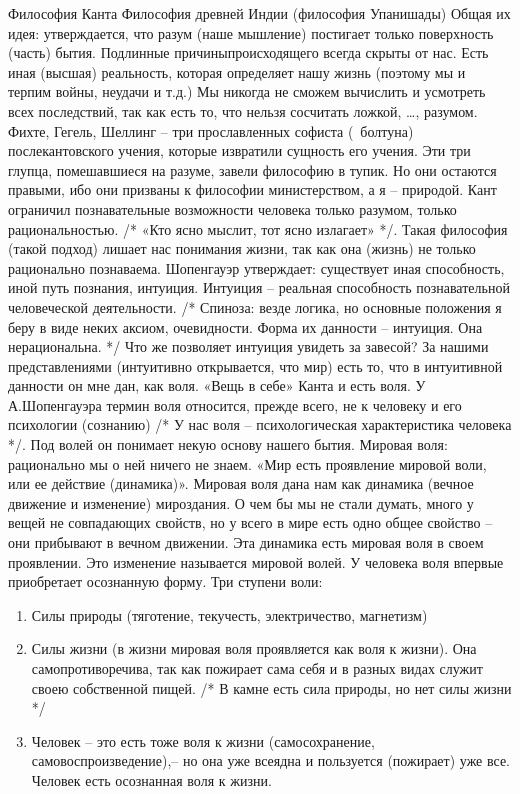 \documentclass[12pt]{article}
\begin{document}
Философия Канта
Философия древней Индии (философия Упанишады)
Общая  их  идея:  утверждается,  что  разум  (наше  мышление)  постигает  только  поверхность  (часть)  бытия.
Подлинные причиныпроисходящего всегда скрыты от нас. Есть иная (высшая) реальность, которая определяет
нашу жизнь (поэтому мы и терпим войны, неудачи и т.д.) Мы никогда не сможем вычислить и усмотреть всех
последствий, так как есть то, что нельзя сосчитать ложкой, …, разумом.
Фихте, Гегель, Шеллинг – три прославленных софиста (~болтуна) послекантовского учения, которые извратили
сущность его учения. Эти три глупца, помешавшиеся на разуме, завели философию в тупик. Но они остаются
правыми, ибо они призваны к философии министерством, а я – природой.
Кант ограничил познавательные возможности человека только разумом, только рациональностью. /* «Кто ясно
мыслит, тот ясно излагает» */. Такая философия (такой подход) лишает нас понимания жизни, так как она
(жизнь) не только рационально познаваема.
Шопенгауэр утверждает: существует иная способность, иной путь познания, интуиция.
Интуиция – реальная способность познавательной человеческой деятельности. /* Спиноза: везде логика, но
основные  положения  я  беру  в  виде  неких  аксиом,  очевидности.  Форма  их  данности  –  интуиция.  Она
нерациональна. */
Что же позволяет интуиция увидеть за завесой? За нашими представлениями (интуитивно открывается, что
мир) есть то, что в интуитивной данности он мне дан, как воля. «Вещь в себе» Канта и есть воля.
У А.Шопенгауэра термин воля относится, прежде всего, не к человеку и его психологии (сознанию) /* У нас
воля – психологическая характеристика человека */. Под волей он понимает некую основу нашего бытия.
Мировая воля: рационально мы о ней ничего не знаем. 
«Мир есть проявление мировой воли, или ее действие (динамика)». Мировая воля дана нам как динамика
(вечное движение и изменение) мироздания. О чем бы мы не стали думать, много у вещей не совпадающих
свойств, но у всего в мире есть одно общее свойство – они прибывают в вечном движении. Эта динамика есть
мировая воля в своем проявлении. Это изменение называется мировой волей.
У человека воля впервые приобретает осознанную форму.
Три ступени воли:
\begin{enumerate}
\item Силы природы (тяготение, текучесть, электричество, магнетизм)
\item Силы жизни (в жизни мировая воля проявляется как воля к жизни). Она самопротиворечива, так как пожирает
сама себя и в разных видах служит своею собственной пищей. /* В камне есть сила природы, но нет силы жизни
*/
\item Человек – это есть  тоже воля к жизни (самосохранение, самовоспроизведение),– но она уже всеядна и
пользуется (пожирает) уже все. Человек есть осознанная воля к жизни.
\end{enumerate}
\end{document}
